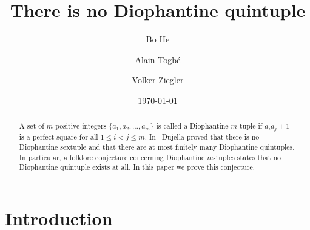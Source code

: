 \documentclass{amsart}
\theoremstyle{definition}
\begin{document}
\title{There is no Diophantine quintuple}

\author{Bo He}
\address{Department of Mathematics, Hubei University for Nationalities, Enshi, Hubei, 445000 P.R. China and Institute of Applied Mathematics,  Aba Teachers University, Wenchuan, Sichuan, 623000 P. R. China}

\author{Alain Togb\'e}
\address{Department of Mathematics, Statistics, and Computer Science, 
Purdue University Northwest, 1401 S, U.S. 421, Westville IN 46391 USA}

\author{Volker Ziegler}
\address{Institute of mathematics, University of Salzburg, Hellbrunner Strasse 34/I, A-5020 Salzburg, Austria}







\begin{abstract}
A set of $m$ positive integers $\{a_1, a_2, \dots , a_m\}$ is called a Diophantine $m$-tuple if $a_i  a_j + 1$ is a perfect square for all $1 \le i < j \le m$. 
In~\cite{Dujella:2004} Dujella proved that there is no Diophantine sextuple and that there are at most finitely many Diophantine quintuples.
In particular, a folklore conjecture concerning Diophantine $m$-tuples states that no Diophantine quintuple exists at all. In this paper we prove this conjecture. 
\end{abstract}

\date{\today}

\maketitle


\tableofcontents


\section{Introduction}\label{sec:1}
\end{document}
